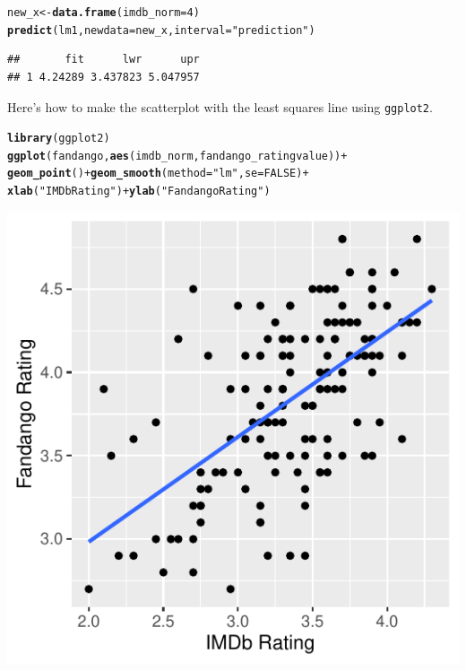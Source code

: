 \documentclass[11pt]{article}\usepackage[]{graphicx}\usepackage[]{color}
\makeatletter
\def\maxwidth{ %
  \ifdim\Gin@nat@width>\linewidth
    \linewidth
  \else
    \Gin@nat@width
  \fi
}
\newcommand{\hlnum}[1]{\textcolor[rgb]{0.686,0.059,0.569}{#1}}%
\newcommand{\hlstr}[1]{\textcolor[rgb]{0.192,0.494,0.8}{#1}}%
\newcommand{\hlopt}[1]{\textcolor[rgb]{0,0,0}{#1}}%
\newcommand{\hlstd}[1]{\textcolor[rgb]{0.345,0.345,0.345}{#1}}%
\newcommand{\hlkwb}[1]{\textcolor[rgb]{0.69,0.353,0.396}{#1}}%
\newcommand{\hlkwc}[1]{\textcolor[rgb]{0.333,0.667,0.333}{#1}}%
\newcommand{\hlkwd}[1]{\textcolor[rgb]{0.737,0.353,0.396}{\textbf{#1}}}%
\newenvironment{kframe}{%
 \def\at@end@of@kframe{}%
 \ifinner\ifhmode%
  \def\at@end@of@kframe{\end{minipage}}%
  \begin{minipage}{\columnwidth}%
 \fi\fi%
 \def\FrameCommand##1{\hskip\@totalleftmargin \hskip-\fboxsep
 \colorbox{shadecolor}{##1}\hskip-\fboxsep
     \hskip-\linewidth \hskip-\@totalleftmargin \hskip\columnwidth}%
 \MakeFramed {\advance\hsize-\width
   \@totalleftmargin\z@ \linewidth\hsize
   \@setminipage}}%
 {\par\unskip\endMakeFramed%
 \at@end@of@kframe}
\newenvironment{knitrout}{}{} %
\makeatother
\begin{document}
\begin{knitrout}
\color{fgcolor}\begin{kframe}
\begin{alltt}
\hlstd{new_x} \hlkwb{<-} \hlkwd{data.frame}\hlstd{(}\hlkwc{imdb_norm} \hlstd{=} \hlnum{4}\hlstd{)}
\hlkwd{predict}\hlstd{(lm1,} \hlkwc{newdata} \hlstd{= new_x,} \hlkwc{interval} \hlstd{=} \hlstr{"prediction"}\hlstd{)}
\end{alltt}
\begin{verbatim}
##       fit      lwr      upr
## 1 4.24289 3.437823 5.047957
\end{verbatim}
\end{kframe}
\end{knitrout}
\clearpage
Here's how to make the scatterplot with the least squares line using \texttt{ggplot2}.

\begin{knitrout}
\color{fgcolor}\begin{kframe}
\begin{alltt}
\hlkwd{library}\hlstd{(ggplot2)}
\hlkwd{ggplot}\hlstd{(fandango,} \hlkwd{aes}\hlstd{(imdb_norm, fandango_ratingvalue))} \hlopt{+}
  \hlkwd{geom_point}\hlstd{()} \hlopt{+} \hlkwd{geom_smooth}\hlstd{(}\hlkwc{method} \hlstd{=} \hlstr{"lm"}\hlstd{,} \hlkwc{se} \hlstd{=} \hlnum{FALSE}\hlstd{)} \hlopt{+}
  \hlkwd{xlab}\hlstd{(}\hlstr{"IMDb Rating"}\hlstd{)} \hlopt{+} \hlkwd{ylab}\hlstd{(}\hlstr{"Fandango Rating"}\hlstd{)}
\end{alltt}
\end{kframe}
\includegraphics[width=\maxwidth]{figure/unnamed-chunk-14-1} 

\end{knitrout}
\end{document}
